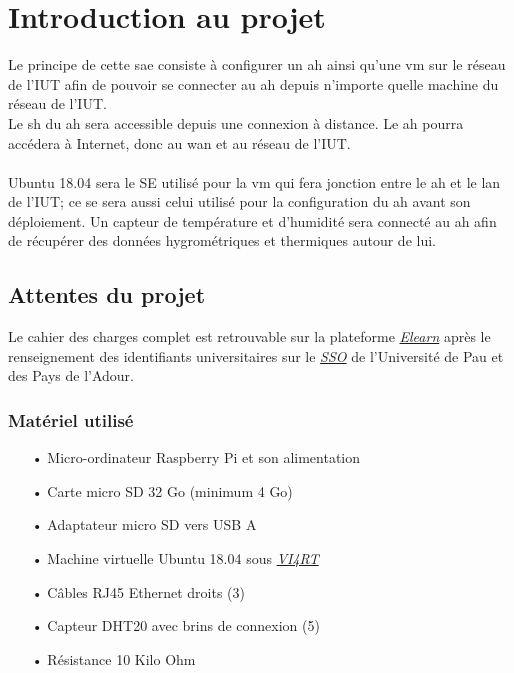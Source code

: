 \documentclass[a4paper]{article}
\begin{document}
\section{Introduction au projet}
Le principe de cette \acrshort{sae} consiste à configurer un \acrshort{ah} ainsi qu'une \acrshort{vm} sur le réseau de l'IUT afin de pouvoir se connecter au \acrshort{ah} depuis n'importe quelle machine du réseau de l'IUT.\\Le \gls{sh} du \acrshort{ah} sera accessible depuis une connexion à distance. Le \acrshort{ah} pourra accédera à Internet, donc au \gls{wan} et au réseau de l'IUT.\\\\Ubuntu 18.04 sera le SE utilisé pour la \acrshort{vm} qui fera jonction entre le \acrshort{ah} et le \gls{lan} de l'IUT; ce \acrshort{se} sera aussi celui utilisé pour la configuration du \acrshort{ah} avant son déploiement. Un capteur de température et d'humidité sera connecté au \acrshort{ah} afin de récupérer des données hygrométriques et thermiques autour de lui. %
\subsection{Attentes du projet}
Le cahier des charges complet est retrouvable sur la plateforme \href{https://elearn.univ-pau.fr/course/view.php?id=18202}{\textit{Elearn}} après le renseignement des identifiants universitaires sur le \href{https://sso.univ-pau.fr/cas/login}{\textit{SSO}} de l'Université de Pau et des Pays de l'Adour.
\subsubsection{Matériel utilisé}
\begin{itemize}
    \item[•] Micro-ordinateur Raspberry Pi et son alimentation
    \item[•] Carte micro SD 32 Go (minimum 4 Go)
    \item[•] Adaptateur micro SD vers USB A
    \item[•] Machine virtuelle Ubuntu 18.04 sous \href{http://vi4rt.univ-pau.fr/}{\textit{VI4RT}}
    \item[•] Câbles RJ45 Ethernet droits (3)
    \item[•] Capteur DHT20 avec brins de connexion (5)
    \item[•] Résistance 10 Kilo Ohm
\end{itemize}
\end{document}
